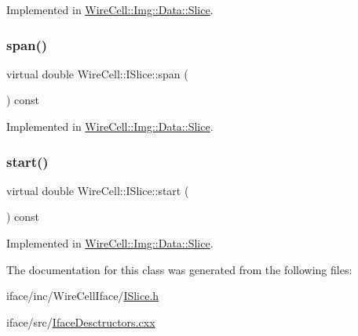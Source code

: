 Implemented in \hyperlink{class_wire_cell_1_1_img_1_1_data_1_1_slice_af4448bb9ab0b80b591763623ac23850a}{Wire\+Cell\+::\+Img\+::\+Data\+::\+Slice}.

\mbox{\label{class_wire_cell_1_1_i_slice_a9c461c84b7b71199ea521bd274df42c6}} 
\subsubsection{\texorpdfstring{span()}{span()}}
{\footnotesize\ttfamily virtual double Wire\+Cell\+::\+I\+Slice\+::span (\begin{DoxyParamCaption}{ }\end{DoxyParamCaption}) const\hspace{0.3cm}{\ttfamily [pure virtual]}}



Implemented in \hyperlink{class_wire_cell_1_1_img_1_1_data_1_1_slice_a35e3999928c41c60b3f0e3eb738c29ca}{Wire\+Cell\+::\+Img\+::\+Data\+::\+Slice}.

\mbox{\label{class_wire_cell_1_1_i_slice_a46a59a60460e2915f80b9647b3b3a82d}} 
\subsubsection{\texorpdfstring{start()}{start()}}
{\footnotesize\ttfamily virtual double Wire\+Cell\+::\+I\+Slice\+::start (\begin{DoxyParamCaption}{ }\end{DoxyParamCaption}) const\hspace{0.3cm}{\ttfamily [pure virtual]}}



Implemented in \hyperlink{class_wire_cell_1_1_img_1_1_data_1_1_slice_acf8f4a84cbee31e3940c387708348f88}{Wire\+Cell\+::\+Img\+::\+Data\+::\+Slice}.



The documentation for this class was generated from the following files\+:\begin{DoxyCompactItemize}
\item 
iface/inc/\+Wire\+Cell\+Iface/\hyperlink{_i_slice_8h}{I\+Slice.\+h}\item 
iface/src/\hyperlink{_iface_desctructors_8cxx}{Iface\+Desctructors.\+cxx}\end{DoxyCompactItemize}
